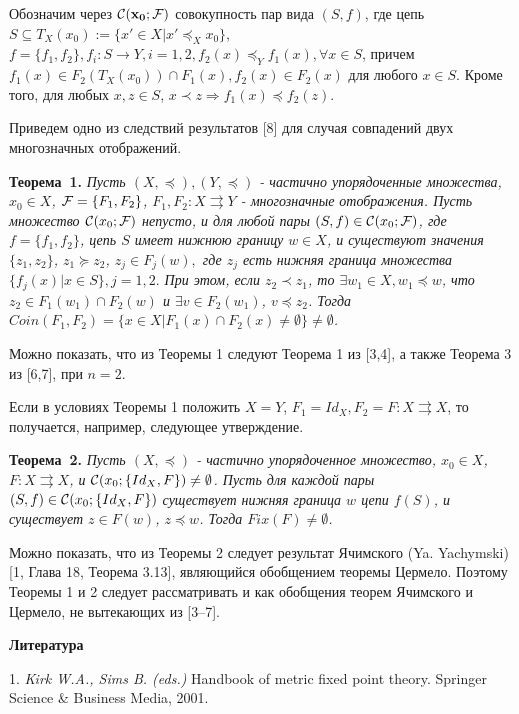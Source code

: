 Обозначим через  ${\bf {\cal C}(x_{0}; {\cal F})}$ совокупность пар вида $(S,f)$, где цепь
$S\subseteq T_{X}(x_{0}):=\{x'\in X |x'\preceq_{X} x_{0}\}$,
$f=\{f_{1}, f_{2}\}, f_{i}: S\to Y,  i=1,2, f_{2}(x)\preceq_{Y} f_{1}(x), \forall x\in S$, причем $f_{1}(x) \in  F_{2}(T_X(x_0))\cap F_{1}(x), f_2(x) \in F_2(x)$ для любого $x\in S$. Кроме того, для любых $x,z\in S$, $x\prec z\Longrightarrow f_{1}(x)\preceq f_{2}(z).$

Приведем  одно из следствий  результатов [8] для случая совпадений двух многозначных  отображений.

\textbf{Теорема~1.} {\it  Пусть $(X,\preceq), (Y,\preceq)$  - частично упорядоченные множества, $x_{0}\in X$, ${\cal F}=\{F_{1},F_{2}\}$,  $F_{1},F_{2}: X\rightrightarrows Y$ - многозначные отображения. Пусть множество ${\cal C}(x_{0}; {\cal F})$ непусто, и для любой пары $(S,f)\in {\cal C}(x_{0}; {\cal F})$, где $f=\{f_{1},f_{2}\}$, цепь $S$ имеет нижнюю границу $w\in X$, и существуют значения  $\{z_{1},z_{2}\}$, $z_{1}\succeq z_{2}$, $z_{j}\in F_{j}(w),$  где $z_{j}$ есть нижняя граница множества $\{f_{j}(x)| x\in S\}, j=1,2.$ При этом, если $z_{2}\prec z_{1}$, то  $\exists w_{1}\in X, w_{1}\preceq w$, что   $z_{2}\in F_{1}(w_{1})\cap F_{2}(w)$ и  $\exists v\in F_{2}(w_{1})$, $v\preceq z_{2}$. Тогда   $Coin(F_{1},F_{2})=\{x\in X| F_{1}(x)\cap F_{2}(x)\ne \emptyset\}\ne \emptyset$.}

Можно показать, что из Теоремы 1 следуют Теорема 1 из [3,4], а также Теорема 3 из [6,7], при $n=2$.

Если в условиях Теоремы 1 положить  $X=Y$, $F_{1}=Id_{X}, F_{2}=F: X\rightrightarrows X$, то  получается, например, следующее утверждение.

\textbf{Теорема~2.} {\it Пусть $(X,\preceq)$  - частично упорядоченное множество, $x_{0}\in X$,   $F: X\rightrightarrows X$, и ${\cal C}(x_{0}; \{Id_{X}, F\})\ne \emptyset$. Пусть для каждой пары $(S,f)\in {\cal C}(x_{0}; \{Id_{X}, F\})$ существует нижняя граница $w$  цепи $f(S)$, и существует $z\in F(w)$, $z\preceq w$. Тогда $Fix(F)\ne \emptyset$.}

Можно показать, что из Теоремы 2 следует результат Ячимского (Ya. Yachymski) [1, Глава 18, Теорема 3.13], являющийся обобщением теоремы Цермело. Поэтому Теоремы 1 и 2 следует рассматривать и как обобщения  теорем Ячимского и  Цермело, не вытекающих из [3--7].



\smallskip \centerline{\bf Литература}\nopagebreak


1. {\it Kirk W.A., Sims B. (eds.)} Handbook of metric fixed point theory. Springer Science \& Business Media,  2001.

